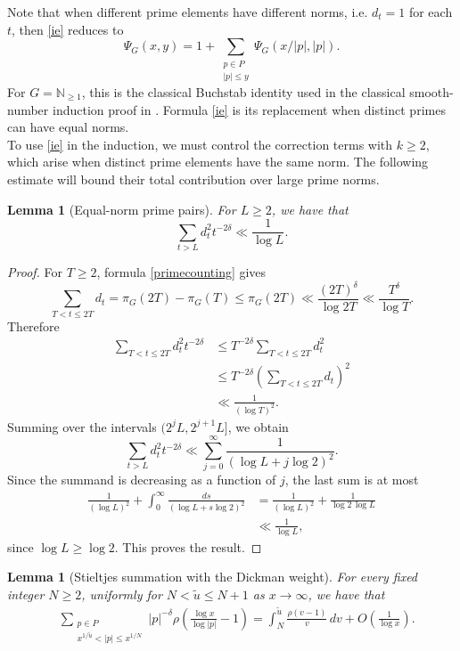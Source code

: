 \documentclass[a4paper]{amsart}
\newtheorem{lemma}[theorem]{Lemma}
\begin{document}
Note that when different prime elements have different norms, i.e.
$d_t=1$ for each $t$, then \eqref{ie} reduces to
\[
\Psi_G(x,y)
=
1+\sum_{\substack{p\in P\\|p|\le y}}
\Psi_G(x/|p|,|p|).
\]
For $G=\mathbb N_{\geq 1}$, this is the classical Buchstab identity
used in the classical smooth-number induction proof in \cite[Chapter 9, Theorem 9.3]{de2023analytic}. Formula \eqref{ie}
is its replacement when distinct primes can have equal norms.\\
To use \eqref{ie} in the induction, we must control
the correction terms with $k\ge2$, which arise when
distinct prime elements have the same norm.
The following estimate will bound their total
contribution over large prime norms.
\begin{lemma}[Equal-norm prime pairs]\label{lem:collision}
For $L\ge2$, we have that
\[
\sum_{t>L}d_t^2t^{-2\delta}
\ll\frac1{\log L}.\]
\end{lemma}

\begin{proof}
For $T\ge2$, formula \eqref{primecounting} gives
\[
\sum_{T<t\le2T}d_t
=
\pi_G(2T)-\pi_G(T) \leq \pi_G(2T) \ll \frac{{(2T)}^\delta}{\log 2T}
\ll\frac{T^\delta}{\log T}.
\]
Therefore
\begin{align*}
\sum_{T<t\le2T}d_t^2t^{-2\delta}
&\le
T^{-2\delta}\sum_{T<t\le2T}d_t^2\\
&\le
T^{-2\delta}
\left(\sum_{T<t\le2T}d_t\right)^2\\
&\ll\frac1{(\log T)^2}.
\end{align*}
Summing over the intervals $(2^jL,2^{j+1}L]$, we obtain
\[
\sum_{t>L}d_t^2t^{-2\delta}
\ll
\sum_{j=0}^{\infty}
\frac1{(\log L+j\log2)^2}.
\]
Since the summand is decreasing as a function of $j$,
the last sum is at most
\begin{align*}
\frac1{(\log L)^2}
+\int_0^\infty
\frac{ds}{(\log L+s\log2)^2}
&=
\frac1{(\log L)^2}
+\frac1{\log2\,\log L}\\
&\ll\frac1{\log L},
\end{align*}
since $\log L \geq \log 2$. This proves the result.
\end{proof}

\begin{lemma}[Stieltjes summation with the Dickman weight]
\label{lem:stieltjes}
For every fixed integer $N\ge2$, uniformly for
$N<\tilde u\le N+1$ as $x\to\infty$, we have that
\begin{align*}
&\sum_{\substack{p\in P\\
x^{1/\tilde u}<|p|\le x^{1/N}}}
|p|^{-\delta}
\rho\!\left(\frac{\log x}{\log|p|}-1\right)=
\int_N^{\tilde u}\frac{\rho(v-1)}v\,dv
+O\!\left(\frac1{\log x}\right).
\end{align*}
\end{lemma}
\end{document}
